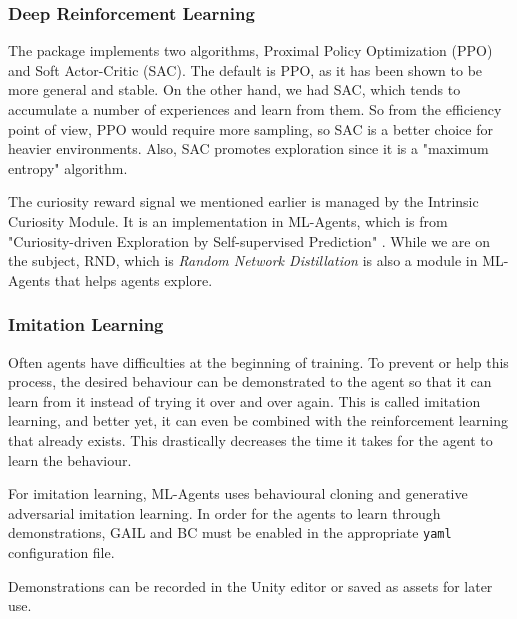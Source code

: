 \documentclass[a4paper,12pt,openright]{book}
\begin{document}
\subsubsection{Deep Reinforcement Learning}

The package implements two algorithms, Proximal Policy Optimization (PPO) and Soft Actor-Critic (SAC). The default is PPO, as it has been shown to be more general and stable. On the other hand, we had SAC, which tends to accumulate a number of experiences and learn from them. So from the efficiency point of view, PPO would require more sampling, so SAC is a better choice for heavier environments. Also, SAC promotes exploration since it is a "maximum entropy" algorithm.

The curiosity reward signal we mentioned earlier is managed by the Intrinsic Curiosity Module. It is an implementation in ML-Agents, which is from "Curiosity-driven Exploration by Self-supervised Prediction" \cite{CuriosityExploration}. While we are on the subject, RND, which is \emph{Random Network Distillation} \cite{ExplorationRND} is also a module in ML-Agents that helps agents explore.

\subsubsection{Imitation Learning}

Often agents have difficulties at the beginning of training. To prevent or help this process, the desired behaviour can be demonstrated to the agent so that it can learn from it instead of trying it over and over again. This is called imitation learning, and better yet, it can even be combined with the reinforcement learning that already exists. This drastically decreases the time it takes for the agent to learn the behaviour.

For imitation learning, ML-Agents uses behavioural cloning and generative adversarial imitation learning. In order for the agents to learn through demonstrations, GAIL and BC must be enabled in the appropriate \texttt{yaml} configuration file.

Demonstrations can be recorded in the Unity editor or saved as assets for later use.
\end{document}
